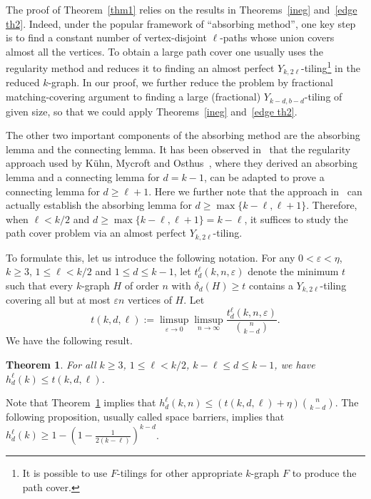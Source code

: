 \documentclass[11pt, reqno]{amsart}    	%
\newtheorem{thm}{Theorem}[section]
\theoremstyle{definition}
\numberwithin{equation}{section}
\begin{document}
	The proof of Theorem~\ref{thm1} relies on the results in Theorems~\ref{ineg} and~\ref{edge th2}.
	Indeed, under the popular framework of ``absorbing method'', one key step is to find a constant number of vertex-disjoint $\ell$-paths whose union covers almost all the vertices.
	To obtain a large path cover one usually uses the regularity method and reduces it to finding an almost perfect  $Y_{k,2\ell}$-tiling\footnote{It is possible to use $F$-tilings for other appropriate $k$-graph $F$ to produce the path cover.} in the reduced $k$-graph.
	In our proof, we further reduce the problem by fractional matching-covering argument to finding a large (fractional) $Y_{k-d,b-d}$-tiling of given size, so that we could apply Theorems~\ref{ineg} and~\ref{edge th2}.
	
	The other two important components of the absorbing method are the absorbing lemma and the connecting lemma.
	It has been observed in~\cite{Han2021Non} that the regularity approach used by K\"uhn, Mycroft and Osthus~\cite{Daniela2010Hamilton}, where they derived an absorbing lemma and a connecting lemma for $d=k-1$, can be adapted to prove a connecting lemma for $d\ge\ell+1$.
	Here we further note that the approach in~\cite{Daniela2010Hamilton} can actually establish the absorbing lemma for $d\ge \max\{k-\ell,\ell+1\}$.
	Therefore, when $\ell<k/2$ and $d\ge \max\{k-\ell,\ell+1\}=k-\ell$, it suffices to study the path cover problem via an almost perfect $Y_{k,2\ell}$-tiling.
	
	To formulate this, let us introduce the following notation.
	For any $ 0<\varepsilon<\eta $, $k\ge3$, $1\leq \ell<k/2$ and $ 1\le d \le k-1 $, let $ t_{d}^{\ell}(k,n,\varepsilon) $ denote
	the minimum $ t $ such that every $k$-graph $H$ of order $n$ with $\delta_d(H)\ge t$ contains a $Y_{k,2\ell}$-tiling covering all but at most $ \varepsilon n $ vertices of $ H $.  Let \[ t(k,d,\ell):=\limsup_{\varepsilon\to 0} \limsup_{n\to \infty} \frac{t_{d}^{\ell}(k,n,\varepsilon)}{\binom{n}{k-d}}.\] 
	We have the following result.
	
	\begin{thm}\label{thm} 
		For all $k\ge3$, $1\leq \ell<k/2$,  $k-\ell\le d \le k-1$, we have $h_{d}^{\ell}(k)\le t(k,d,\ell)$.
	\end{thm}
	
	
	Note that Theorem~\ref{thm} implies that $ h_{d}^{\ell}(k,n)\le(t(k,d,\ell)+\eta) \binom{n}{k-d}$.
	The following proposition, usually called space barriers, implies that $h_{d}^{\ell}(k)\ge1-(1-\frac{1}{2(k-\ell)})^{k-d}$.
	
\end{document}
